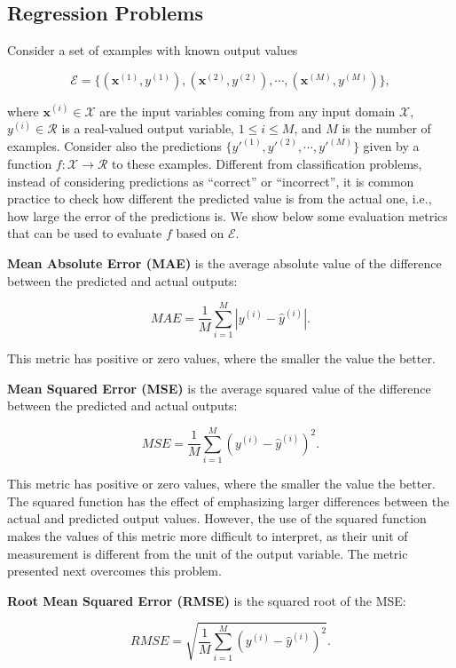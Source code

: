 \subsection{Regression Problems}
\label{sec:eval-metrics-regression}

Consider a set of examples with known output values 

\[\mathcal{E} = \{(\mathbf{x}^{(1)},y^{(1)}), (\mathbf{x}^{(2)},y^{(2)}), \cdots, (\mathbf{x}^{(M)},y^{(M)})\},\] 

\noindent where $\mathbf{x}^{(i)} \in \mathcal{X}$ are the input variables coming from any input domain $\mathcal{X}$, $y^{(i)} \in \mathcal{R}$ is a real-valued output variable, $1 \leq i \leq M$, and $M$ is the number of examples.  Consider also the predictions $\{y'^{(1)},y'^{(2)}, \cdots, y'^{(M)}\}$ given by a function $f: \mathcal{X} \rightarrow \mathcal{R}$ to these examples. Different from classification problems, instead of considering predictions as ``correct'' or ``incorrect'', it is common practice to check how different the predicted value is from the actual one, i.e., how large the error of the predictions is.  We show below some evaluation metrics that can be used to evaluate $f$ based on $\mathcal{E}$. 

\textbf{Mean Absolute Error (MAE)} is the average absolute value of the difference between the predicted and actual outputs:

\[ MAE = \frac{1}{M} \sum_{i=1}^M |y^{(i)} - \hat{y}^{(i)}|.\]

\noindent This metric has positive or zero values, where the smaller the value the better. 

\textbf{Mean Squared Error (MSE)} is the average squared value of the difference between the predicted and actual outputs:

\[ MSE = \frac{1}{M} \sum_{i=1}^M (y^{(i)} - \hat{y}^{(i)})^2.\]

\noindent This metric has positive or zero values, where the smaller the value the better. The squared function has the effect of emphasizing larger differences between the actual and predicted output values. However, the use of the squared function makes the values of this metric more difficult to interpret, as their unit of measurement is different from the unit of the output variable. The metric presented next overcomes this problem.

\textbf{Root Mean Squared Error (RMSE)} is the squared root of the MSE:

\[ RMSE = \sqrt{\frac{1}{M} \sum_{i=1}^M (y^{(i)} - \hat{y}^{(i)})^2}.\]

